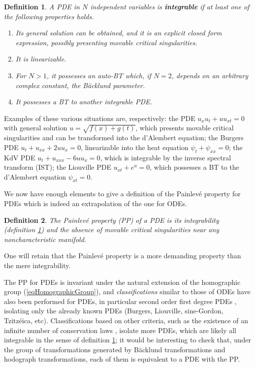\documentclass[10pt]{article}
\newtheorem{definition}{Definition}
\begin{document}
\begin{definition}
A PDE in $N$ independent variables is \textbf{integrable}
if at least one of the following properties holds.
\begin{enumerate}
\item
Its general solution can be obtained, and it is an explicit closed form 
expression, possibly presenting movable critical singularities.

\item
It is linearizable. 

\item
For $N>1$, it possesses an auto-BT which, if $N=2$,
depends on an arbitrary complex constant, the B\"acklund parameter.

\item
It possesses a BT to another integrable PDE.

\end{enumerate}
\label{definitionIntegrable}
\end{definition}

Examples of these various situations are, respectively:
the PDE $u_x u_t + u u_{xt}=0$ 
with general solution $u=\sqrt{f(x)+g(t)}$,
which presents movable critical singularities 
and can be transformed into the d'Alembert equation;
the Burgers PDE $u_t + u_{xx} + 2 u u_x=0$, 
linearizable into the heat equation $\psi_t + \psi_{xx} =0$;
the KdV PDE $u_t + u_{xxx} - 6 u u_x=0$,
which is integrable by the inverse spectral transform (IST);
the Liouville PDE $u_{xt} + e^u=0$,
which possesses a BT to the d'Alembert equation $\psi_{xt}=0$.

We now have enough elements 
to give a definition of the Painlev\'e property 
for PDEs which is indeed an extrapolation of the one for ODEs.

\begin{definition}
The \textit{Painlev\'e property} (PP) of a PDE is
its integrability (definition \ref{definitionIntegrable})
and the absence of movable critical singularities 
near any noncharacteristic manifold.
\label{definitionPPPDE}
\end{definition}

One will retain that the Painlev\'e property is a more demanding property
than the mere integrability.

The PP for PDEs is invariant under the natural extension 
of the homographic group (\ref{eqHomographicGroup}),
and \textit{classifications} similar to those of ODEs have also been performed
for PDEs,
in particular second order first degree PDEs 
\cite{CosPDEhyper,CosPDEpara},
isolating only the already known PDEs 
(Burgers, Liouville, sine-Gordon, Tzitz\'eica, etc).
Classifications based on other criteria,
such as the existence of an infinite number of conservation laws
\cite{MSS1991},
isolate more PDEs,
which are likely all integrable in the sense of 
definition \ref{definitionIntegrable};
it would be interesting to check that,
under the group of transformations generated by 
B\"acklund transformations and hodograph transformations,
each of them is equivalent to a PDE with the PP.
\end{document}
